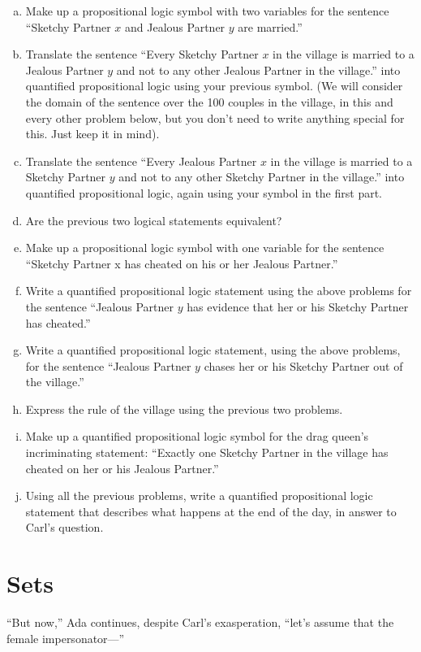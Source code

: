 \documentclass{article}
\begin{document}
\begin{enumerate}[(a)]
\item
Make up a propositional logic symbol with two variables
for the sentence ``Sketchy Partner $x$ and Jealous Partner $y$ are married.''
\item
Translate the sentence ``Every Sketchy Partner $x$ in the village is
married to a Jealous Partner $y$ and not to any other Jealous Partner in the village.''
into quantified propositional logic using your previous symbol.
(We will consider the domain of the sentence over the 100
couples in the village, in this and every other problem below,
but you don't need to write anything special for this. Just keep it in mind).
\item
Translate the sentence ``Every Jealous Partner $x$ in the village is
married to a Sketchy Partner $y$ and not to any other Sketchy Partner in the village.''
into quantified propositional logic, again using your symbol in
the first part.
\item
Are the previous two logical statements equivalent?
\item
Make up a propositional logic symbol with one variable for
the sentence ``Sketchy Partner x has cheated on his or her Jealous Partner.''
\item
Write a quantified propositional logic statement using the
above problems for
the sentence ``Jealous Partner $y$ has evidence that her or his Sketchy Partner has cheated.''
\item
Write a quantified propositional logic statement, using the above
problems,
for the sentence ``Jealous Partner $y$ chases her or his Sketchy Partner out of the village.''
\item
Express the rule of the village using the previous two problems.
\item
Make up a quantified propositional logic symbol for
the drag queen's incriminating statement:
``Exactly one Sketchy Partner in the
village has cheated on her or his Jealous Partner.''
\item
Using all the previous problems,
write a quantified propositional logic statement that describes
what happens at the end of the day, in answer to Carl's question.
\end{enumerate}

\section{Sets}

``But now,'' Ada continues, despite Carl's exasperation,
``let's assume that the female impersonator---''
\end{document}
